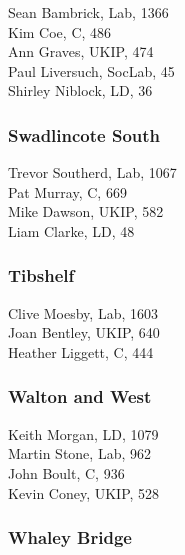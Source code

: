 \documentclass[a4paper,openany,10pt]{book}
\begin{document}

Sean Bambrick, Lab, 1366\\
Kim Coe, C, 486\\
Ann Graves, UKIP, 474\\
Paul Liversuch, SocLab, 45\\
Shirley Niblock, LD, 36\\


\subsubsection*{Swadlincote South}



Trevor Southerd, Lab, 1067\\
Pat Murray, C, 669\\
Mike Dawson, UKIP, 582\\
Liam Clarke, LD, 48\\


\subsubsection*{Tibshelf}



Clive Moesby, Lab, 1603\\
Joan Bentley, UKIP, 640\\
Heather Liggett, C, 444\\


\subsubsection*{Walton and West}



Keith Morgan, LD, 1079\\
Martin Stone, Lab, 962\\
John Boult, C, 936\\
Kevin Coney, UKIP, 528\\


\subsubsection*{Whaley Bridge}

\end{document}
